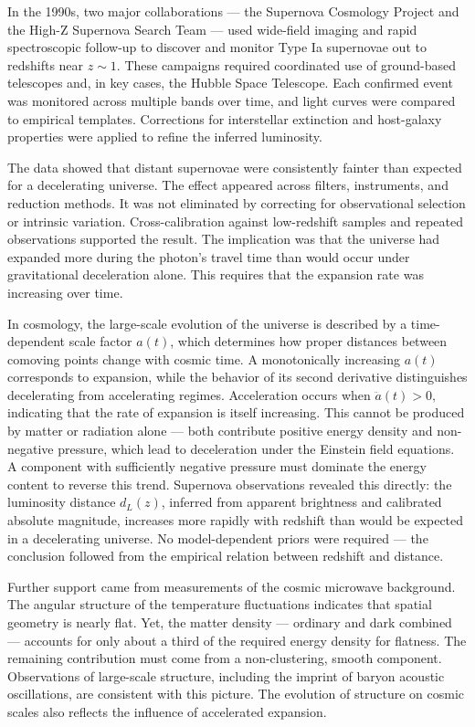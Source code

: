 In the 1990s, two major collaborations — the Supernova Cosmology Project and the High-Z Supernova Search Team — used wide-field imaging and rapid spectroscopic follow-up to discover and monitor Type Ia supernovae out to redshifts near $z \sim 1$. These campaigns required coordinated use of ground-based telescopes and, in key cases, the Hubble Space Telescope. Each confirmed event was monitored across multiple bands over time, and light curves were compared to empirical templates. Corrections for interstellar extinction and host-galaxy properties were applied to refine the inferred luminosity.

The data showed that distant supernovae were consistently fainter than expected for a decelerating universe. The effect appeared across filters, instruments, and reduction methods. It was not eliminated by correcting for observational selection or intrinsic variation. Cross-calibration against low-redshift samples and repeated observations supported the result. The implication was that the universe had expanded more during the photon's travel time than would occur under gravitational deceleration alone. This requires that the expansion rate was increasing over time.

In cosmology, the large-scale evolution of the universe is described by a time-dependent scale factor $a(t)$, which determines how proper distances between comoving points change with cosmic time. A monotonically increasing $a(t)$ corresponds to expansion, while the behavior of its second derivative distinguishes decelerating from accelerating regimes. Acceleration occurs when $\ddot{a}(t) > 0, $ indicating that the rate of expansion is itself increasing. This cannot be produced by matter or radiation alone — both contribute positive energy density and non-negative pressure, which lead to deceleration under the Einstein field equations. A component with sufficiently negative pressure must dominate the energy content to reverse this trend. Supernova observations revealed this directly: the luminosity distance $d_L(z)$, inferred from apparent brightness and calibrated absolute magnitude, increases more rapidly with redshift than would be expected in a decelerating universe. No model-dependent priors were required — the conclusion followed from the empirical relation between redshift and distance.

Further support came from measurements of the cosmic microwave background. The angular structure of the temperature fluctuations indicates that spatial geometry is nearly flat. Yet, the matter density — ordinary and dark combined — accounts for only about a third of the required energy density for flatness. The remaining contribution must come from a non-clustering, smooth component. Observations of large-scale structure, including the imprint of baryon acoustic oscillations, are consistent with this picture. The evolution of structure on cosmic scales also reflects the influence of accelerated expansion.

